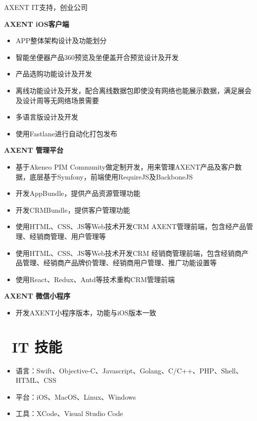 \documentclass{resume}
\begin{document}
AXENT IT支持，创业公司

\begin{onehalfspacing}
    \textbf{AXENT iOS客户端}
    \begin{itemize}
        \item APP整体架构设计及功能划分
        \item 智能坐便器产品360预览及坐便盖开合预览设计及开发
        \item 产品选购功能设计及开发
        \item 离线功能设计及开发，配合离线数据包即使没有网络也能展示数据，满足展会及设计周等无网络场景需要
        \item 多语言版设计及开发
        \item 使用Fastlane进行自动化打包发布
    \end{itemize}
\end{onehalfspacing}

\begin{onehalfspacing}
    \textbf{AXENT 管理平台}
    \begin{itemize}
        \item 基于Akeneo PIM Community做定制开发，用来管理AXENT产品及客户数据，底层基于Symfony，前端使用RequireJS及BackboneJS
        \item 开发AppBundle，提供产品资源管理功能
        \item 开发CRMBundle，提供客户管理功能
        \item 使用HTML、CSS、JS等Web技术开发CRM AXENT管理前端，包含经产品管理、经销商管理、用户管理等
        \item 使用HTML、CSS、JS等Web技术开发CRM 经销商管理前端，包含经销商产品管理、经销商产品牌价管理、经销商用户管理、推广功能设置等
        \item 使用React、Redux、Antd等技术重构CRM管理前端
    \end{itemize}
\end{onehalfspacing}

\begin{onehalfspacing}
    \textbf{AXENT 微信小程序}
    \begin{itemize}
        \item 开发AXENT小程序版本，功能与iOS版本一致
    \end{itemize}
\end{onehalfspacing}

\section{\faCogs\ IT 技能}
\begin{itemize}[parsep=0.5ex]
    \item 语言：Swift、Objective-C、Javascript、Golang、C/C++、PHP、Shell、HTML、CSS
    \item 平台：iOS、MacOS、Linux、Windows
    \item 工具：XCode、Visual Studio Code
\end{itemize}
\end{document}
